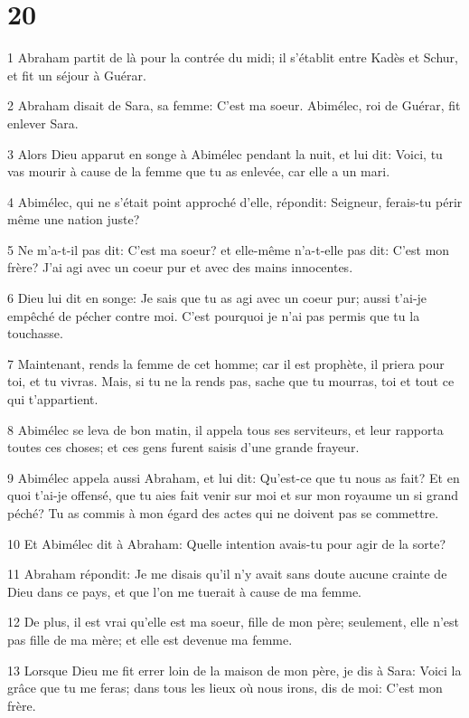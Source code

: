 \chapter{20}

\par 1 Abraham partit de là pour la contrée du midi; il s'établit entre Kadès et Schur, et fit un séjour à Guérar.
\par 2 Abraham disait de Sara, sa femme: C'est ma soeur. Abimélec, roi de Guérar, fit enlever Sara.
\par 3 Alors Dieu apparut en songe à Abimélec pendant la nuit, et lui dit: Voici, tu vas mourir à cause de la femme que tu as enlevée, car elle a un mari.
\par 4 Abimélec, qui ne s'était point approché d'elle, répondit: Seigneur, ferais-tu périr même une nation juste?
\par 5 Ne m'a-t-il pas dit: C'est ma soeur? et elle-même n'a-t-elle pas dit: C'est mon frère? J'ai agi avec un coeur pur et avec des mains innocentes.
\par 6 Dieu lui dit en songe: Je sais que tu as agi avec un coeur pur; aussi t'ai-je empêché de pécher contre moi. C'est pourquoi je n'ai pas permis que tu la touchasse.
\par 7 Maintenant, rends la femme de cet homme; car il est prophète, il priera pour toi, et tu vivras. Mais, si tu ne la rends pas, sache que tu mourras, toi et tout ce qui t'appartient.
\par 8 Abimélec se leva de bon matin, il appela tous ses serviteurs, et leur rapporta toutes ces choses; et ces gens furent saisis d'une grande frayeur.
\par 9 Abimélec appela aussi Abraham, et lui dit: Qu'est-ce que tu nous as fait? Et en quoi t'ai-je offensé, que tu aies fait venir sur moi et sur mon royaume un si grand péché? Tu as commis à mon égard des actes qui ne doivent pas se commettre.
\par 10 Et Abimélec dit à Abraham: Quelle intention avais-tu pour agir de la sorte?
\par 11 Abraham répondit: Je me disais qu'il n'y avait sans doute aucune crainte de Dieu dans ce pays, et que l'on me tuerait à cause de ma femme.
\par 12 De plus, il est vrai qu'elle est ma soeur, fille de mon père; seulement, elle n'est pas fille de ma mère; et elle est devenue ma femme.
\par 13 Lorsque Dieu me fit errer loin de la maison de mon père, je dis à Sara: Voici la grâce que tu me feras; dans tous les lieux où nous irons, dis de moi: C'est mon frère.
